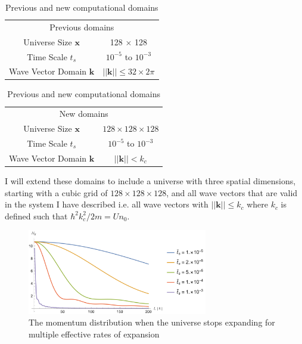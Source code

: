 \documentclass{article}
\begin{document}
            \begin{table}[h]
                \centering
                \begin{tabular}{c|c}
                    \multicolumn{2}{c}{Previous domains}  \\
                        Universe Size $\mathbf{x}$      & 128 $\times$ 128 \\
                        \hline
                        Time Scale $t_s$                & $10^{-5}$ to $10^{-3}$ \\
                        \hline
                        Wave Vector Domain $\mathbf{k}$ & $||\mathbf{k}|| \leq 32 \times 2 \pi$ \\
                \end{tabular}
                \quad
                \begin{tabular}{c|c}
                    \multicolumn{2}{c}{New domains}  \\
                        Universe Size $\mathbf{x}$      & $128 \times 128 \times 128$ \\
                        \hline
                        Time Scale $t_s$                & $10^{-5}$ to $10^{-3}$ \\
                        \hline
                        Wave Vector Domain $\mathbf{k}$ & $||\mathbf{k}|| < k_c$ \\
                \end{tabular}
                \caption{Previous and new computational domains}
                \label{tab:Domains}
            \end{table}

            I will extend these domains to include a universe with three spatial dimensions, starting with a cubic grid of $128 \times 128 \times 128$, and all wave vectors that are valid in the system I have described i.e. all wave vectors with $||\mathbf{k}|| \leq k_c$ where $k_c$ is defined such that $\hbar^2 k_c^2 / 2 m = U n_0$.

            \begin{figure}[h]
                \centering
                \includegraphics[width = 0.7\textwidth]{images/fig2.png}
                \caption{The momentum distribution when the universe stops expanding for multiple effective rates of expansion}
                \label{fig:finalTime}
            \end{figure}
\end{document}
